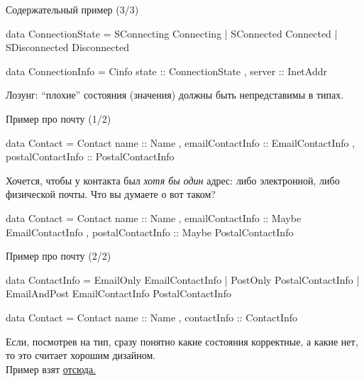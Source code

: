 \documentclass[
  xcolor={svgnames},
  hyperref={colorlinks,citecolor=DeepPink4,linkcolor=DarkRed,urlcolor=DarkBlue}]{beamer}
\begin{document}
\begin{frame}[fragile]{Содержательный пример (3/3)}
\begin{verbnobox}[\monacoB]
data ConnectionState = 
    SConnecting   Connecting 
  | SConnected    Connected 
  | SDisconnected Disconnected 
 
data ConnectionInfo = Cinfo 
  { state ::  ConnectionState
  , server :: InetAddr } 
\end{verbnobox}
\pause
Лозунг: ``плохие'' состояния (значения) должны быть непредставимы в типах.
\end{frame}

\begin{frame}[fragile]{Пример про почту (1/2)}
\begin{verbnobox}[\monacoB]
data Contact = Contact 
    { name :: Name
    , emailContactInfo :: EmailContactInfo
    , postalContactInfo :: PostalContactInfo }
\end{verbnobox}
\pause
Хочется, чтобы у контакта был \textit{хотя бы один} адрес: либо электронной, либо физической почты.
\pause
Что вы думаете о вот таком?
\begin{hslisting}
data Contact = Contact 
    { name :: Name
    , emailContactInfo :: Maybe EmailContactInfo
    , postalContactInfo :: Maybe PostalContactInfo }
\end{hslisting}
\end{frame}

\begin{frame}[fragile]{Пример про почту (2/2)}
\begin{verbnobox}[\monacoB]
data ContactInfo = 
    EmailOnly    EmailContactInfo
  | PostOnly     PostalContactInfo
  | EmailAndPost EmailContactInfo PostalContactInfo

data Contact = Contact
  { name        :: Name
  , contactInfo :: ContactInfo
  }
\end{verbnobox}

Если, посмотрев на тип, сразу понятно какие состояния корректные, а какие нет, то это считает хорошим дизайном.\\
\vspace{0.5cm}
Пример взят \href{https://fsharpforfunandprofit.com/posts/designing-with-types-making-illegal-states-unrepresentable/}{отсюда.}
\end{frame}
\end{document}
